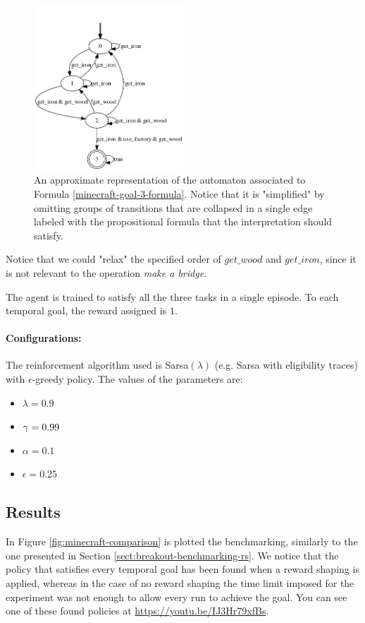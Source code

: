 \begin{figure}[h]
	\centering
	\includegraphics[width=0.5\textwidth]{images/minecraft_goal.png}
	\caption{An approximate representation of the automaton associated to Formula \ref{minecraft-goal-3-formula}. Notice that it is "simplified" by omitting groups of transitions that are collapsed in a single edge labeled with the propositional formula that the interpretation should satisfy.}
	\label{fig:minecraft-goal-3-automaton}
\end{figure}

Notice that we could "relax" the specified order of $get\_wood$ and $get\_iron$, since it is not relevant to the operation \emph{make a bridge}.

The agent is trained to satisfy all the three tasks in a single episode. To each temporal goal, the reward assigned is $1$.

\paragraph{Configurations:}
The reinforcement algorithm used is Sarsa$(\lambda)$ (e.g. Sarsa with eligibility traces) with $\epsilon$-greedy policy. The values of the parameters are:
	\begin{itemize}
		\item $\lambda = 0.9$
		\item $\gamma=0.99$	
		\item $\alpha=0.1$
		\item $\epsilon= 0.25$
	\end{itemize}

\subsection{Results}
In Figure \ref{fig:minecraft-comparison} is plotted the benchmarking, similarly to the one presented in Section \ref{sect:breakout-benchmarking-rs}. We notice that the policy that satisfies every temporal goal has been found when a reward shaping is applied, whereas in the case of no reward shaping the time limit imposed for the experiment was not enough to allow every run to achieve the goal. You can see one of these found policies at \url{https://youtu.be/IJ3Hr79xfBs}.

